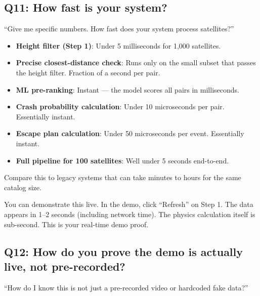 \documentclass[11pt,a4paper]{article}
\begin{document}
\subsection*{Q11: How fast is your system?}

\begin{questionbox}
``Give me specific numbers. How fast does your system process satellites?''
\end{questionbox}

\begin{answerbox}
\begin{itemize}
    \item \textbf{Height filter (Step 1)}: Under 5 milliseconds for 1,000 satellites.
    \item \textbf{Precise closest-distance check}: Runs only on the small subset that passes the height filter. Fraction of a second per pair.
    \item \textbf{ML pre-ranking}: Instant --- the model scores all pairs in milliseconds.
    \item \textbf{Crash probability calculation}: Under 10 microseconds per pair. Essentially instant.
    \item \textbf{Escape plan calculation}: Under 50 microseconds per event. Essentially instant.
    \item \textbf{Full pipeline for 100 satellites}: Well under 5 seconds end-to-end.
\end{itemize}
Compare this to legacy systems that can take minutes to hours for the same catalog size.
\end{answerbox}

\begin{tipbox}
You can demonstrate this live. In the demo, click ``Refresh'' on Step 1. The data appears in 1--2 seconds (including network time). The physics calculation itself is sub-second. This is your real-time demo proof.
\end{tipbox}

\vspace{1em}
\subsection*{Q12: How do you prove the demo is actually live, not pre-recorded?}

\begin{questionbox}
``How do I know this is not just a pre-recorded video or hardcoded fake data?''
\end{questionbox}
\end{document}
